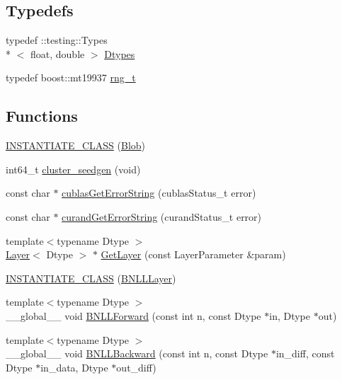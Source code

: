 \subsection*{Typedefs}
\begin{DoxyCompactItemize}
\item 
typedef \+::testing\+::\+Types\\*
$<$ float, double $>$ \hyperlink{namespacecaffe_a131dc2be50f2f10e18450da61cde6b57}{Dtypes}
\item 
typedef boost\+::mt19937 \hyperlink{namespacecaffe_aeff0d41eefd30caf64b0c9d03e142af3}{rng\+\_\+t}
\end{DoxyCompactItemize}
\subsection*{Functions}
\begin{DoxyCompactItemize}
\item 
\hyperlink{namespacecaffe_a23fdc8cf55ff6d4673e4d6a9379cd478}{I\+N\+S\+T\+A\+N\+T\+I\+A\+T\+E\+\_\+\+C\+L\+A\+S\+S} (\hyperlink{classcaffe_1_1_blob}{Blob})
\item 
int64\+\_\+t \hyperlink{namespacecaffe_a50ff47a60ff1b1d917edd1254d770fbb}{cluster\+\_\+seedgen} (void)
\item 
const char $\ast$ \hyperlink{namespacecaffe_ad035f2ba804d9d55dfe0076375a8516c}{cublas\+Get\+Error\+String} (cublas\+Status\+\_\+t error)
\item 
const char $\ast$ \hyperlink{namespacecaffe_a8a736b14d6bccddf4aaf8f6b91db9fc5}{curand\+Get\+Error\+String} (curand\+Status\+\_\+t error)
\item 
{\footnotesize template$<$typename Dtype $>$ }\\\hyperlink{classcaffe_1_1_layer}{Layer}$<$ Dtype $>$ $\ast$ \hyperlink{namespacecaffe_a66f2f7373c9e85f013457dbdce7edf11}{Get\+Layer} (const Layer\+Parameter \&param)
\item 
\hyperlink{namespacecaffe_a301bc2174de79871a19fb90bb561791b}{I\+N\+S\+T\+A\+N\+T\+I\+A\+T\+E\+\_\+\+C\+L\+A\+S\+S} (\hyperlink{classcaffe_1_1_b_n_l_l_layer}{B\+N\+L\+L\+Layer})
\item 
{\footnotesize template$<$typename Dtype $>$ }\\\+\_\+\+\_\+global\+\_\+\+\_\+ void \hyperlink{namespacecaffe_ac548467e1292199237ab19aa45f5c811}{B\+N\+L\+L\+Forward} (const int n, const Dtype $\ast$in, Dtype $\ast$out)
\item 
{\footnotesize template$<$typename Dtype $>$ }\\\+\_\+\+\_\+global\+\_\+\+\_\+ void \hyperlink{namespacecaffe_a0f76f2632b52e7b302516e706e3db06e}{B\+N\+L\+L\+Backward} (const int n, const Dtype $\ast$in\+\_\+diff, const Dtype $\ast$in\+\_\+data, Dtype $\ast$out\+\_\+diff)

\end{DoxyCompactItemize}
